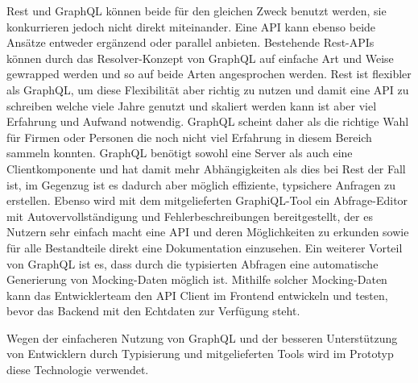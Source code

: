 Rest und GraphQL können beide für den gleichen Zweck benutzt werden, sie konkurrieren jedoch nicht direkt miteinander. Eine API kann ebenso beide Ansätze entweder ergänzend oder parallel anbieten. Bestehende Rest-APIs können durch das Resolver-Konzept von GraphQL auf einfache Art und Weise gewrapped werden und so auf beide Arten angesprochen werden. Rest ist flexibler als GraphQL, um diese Flexibilität aber richtig zu nutzen und damit eine API zu schreiben welche viele Jahre genutzt und skaliert werden kann ist aber viel Erfahrung und Aufwand notwendig. GraphQL scheint daher als die richtige Wahl für Firmen oder Personen die noch nicht viel Erfahrung in diesem Bereich sammeln konnten. GraphQL benötigt sowohl eine Server als auch eine Clientkomponente und hat damit mehr Abhängigkeiten als dies bei Rest der Fall ist, im Gegenzug ist es dadurch aber möglich effiziente, typsichere Anfragen zu erstellen. Ebenso wird mit dem mitgelieferten GraphiQL-Tool ein Abfrage-Editor mit Autovervollständigung und Fehlerbeschreibungen bereitgestellt, der es Nutzern sehr einfach macht eine API und deren Möglichkeiten zu erkunden sowie für alle Bestandteile direkt eine Dokumentation einzusehen. Ein weiterer Vorteil von GraphQL ist es, dass durch die typisierten Abfragen eine automatische Generierung von Mocking-Daten möglich ist. Mithilfe solcher Mocking-Daten kann das Entwicklerteam den API Client im Frontend entwickeln und testen, bevor das Backend mit den Echtdaten zur Verfügung steht.

Wegen der einfacheren Nutzung von GraphQL und der besseren Unterstützung von Entwicklern durch Typisierung und mitgelieferten Tools wird im Prototyp diese Technologie verwendet.
